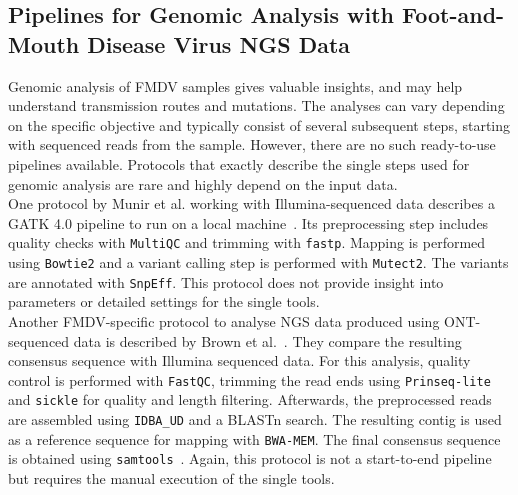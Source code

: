 \subsection{Pipelines for Genomic Analysis with Foot-and-Mouth Disease Virus NGS Data}\label{sec:2-fmdv-pipelines}
Genomic analysis of \ac{FMDV} samples gives valuable insights, and may help understand transmission routes and mutations. The analyses can vary depending on the specific objective and typically consist of several subsequent steps, starting with sequenced reads from the sample. However, there are no such ready-to-use pipelines available. Protocols that exactly describe the single steps used for genomic analysis are rare and highly depend on the input data. \\
One protocol by Munir et al. working with Illumina-sequenced data describes a \ac{GATK} 4.0 pipeline to run on a local machine~\cite{munir2022whole}. Its preprocessing step includes quality checks with \texttt{MultiQC} and trimming with \texttt{fastp}. Mapping is performed using \texttt{Bowtie2} and a variant calling step is performed with \texttt{Mutect2}. The variants are annotated with \texttt{SnpEff}. This protocol does not provide insight into parameters or detailed settings for the single tools. \\
Another \ac{FMDV}-specific protocol to analyse \ac{NGS} data produced using \ac{ONT}-sequenced data is described by Brown et al.~\cite{brown2021characterising}. They compare the resulting consensus sequence with Illumina sequenced data. For this analysis, quality control is performed with \texttt{FastQC}, trimming the read ends using \texttt{Prinseq-lite} and \texttt{sickle} for quality and length filtering. Afterwards, the preprocessed reads are assembled using \texttt{IDBA\_UD} and a \ac{BLAST}n search. The resulting contig is used as a reference sequence for mapping with \texttt{BWA-MEM}. The final consensus sequence is obtained using \texttt{samtools}~\cite{brown2021characterising}. Again, this protocol is not a start-to-end pipeline but requires the manual execution of the single tools.
